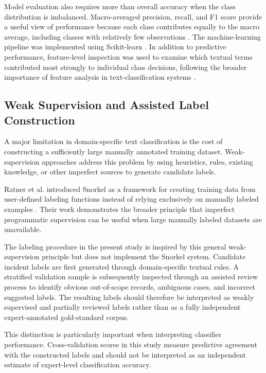 \documentclass[conference]{IEEEtran}
\begin{document}
Model evaluation also requires more than overall accuracy when the class
distribution is imbalanced. Macro-averaged precision, recall, and F1 score
provide a useful view of performance because each class contributes equally
to the macro average, including classes with relatively few observations
\cite{sokolova2009}. The machine-learning pipeline was implemented using
Scikit-learn \cite{pedregosa2011}. In addition to predictive performance,
feature-level inspection was used to examine which textual terms contributed
most strongly to individual class decisions, following the broader importance
of feature analysis in text-classification systems \cite{forman2003}.

\subsection{Weak Supervision and Assisted Label Construction}

A major limitation in domain-specific text classification is the cost of
constructing a sufficiently large manually annotated training dataset.
Weak-supervision approaches address this problem by using heuristics, rules,
existing knowledge, or other imperfect sources to generate candidate labels.

Ratner et al. introduced Snorkel as a framework for creating training data
from user-defined labeling functions instead of relying exclusively on
manually labeled examples \cite{ratner2017}. Their work demonstrates the
broader principle that imperfect programmatic supervision can be useful when
large manually labeled datasets are unavailable.

The labeling procedure in the present study is inspired by this general
weak-supervision principle but does not implement the Snorkel system.
Candidate incident labels are first generated through domain-specific textual
rules. A stratified validation sample is subsequently inspected through an
assisted review process to identify obvious out-of-scope records, ambiguous
cases, and incorrect suggested labels. The resulting labels should therefore
be interpreted as weakly supervised and partially reviewed labels rather than
as a fully independent expert-annotated gold-standard corpus.

This distinction is particularly important when interpreting classifier
performance. Cross-validation scores in this study measure predictive
agreement with the constructed labels and should not be interpreted as an
independent estimate of expert-level classification accuracy.
\end{document}
